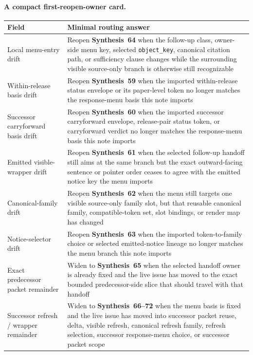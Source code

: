 \documentclass[11pt]{article}
\begin{document}
\paragraph{A compact first-reopen-owner card.}
\begin{table}[t]
\centering
\small
\begin{tabularx}{\linewidth}{@{}lX@{}}
\toprule
Field & Minimal routing answer \\
\midrule
Local menu-entry drift & Reopen \textbf{Synthesis~64} when the follow-up class, owner-side menu key, selected \nolinkurl{object_key}, canonical citation path, or sufficiency clause changes while the surrounding visible source-only branch is otherwise still recognizable \\
Within-release basis drift & Reopen \textbf{Synthesis~59} when the imported within-release status envelope or its paper-level token no longer matches the response-menu basis this note imports \\
Successor carryforward basis drift & Reopen \textbf{Synthesis~60} when the imported successor carryforward envelope, release-pair status token, or carryforward verdict no longer matches the response-menu basis this note imports \\
Emitted visible-wrapper drift & Reopen \textbf{Synthesis~61} when the selected follow-up handoff still aims at the same branch but the exact outward-facing sentence or pointer order ceases to agree with the emitted notice key the menu imports \\
Canonical-family drift & Reopen \textbf{Synthesis~62} when the menu still targets one visible source-only family slot, but that reusable canonical family, compatible-token set, slot bindings, or render map has changed \\
Notice-selector drift & Reopen \textbf{Synthesis~63} when the imported token-to-family choice or selected emitted-notice lineage no longer matches the menu branch this note imports \\
Exact predecessor packet remainder & Widen to \textbf{Synthesis~65} when the selected handoff owner is already fixed and the live issue has moved to the exact bounded predecessor-side slice that should travel with that handoff \\
Successor refresh / wrapper remainder & Widen to \textbf{Synthesis~66--72} when the menu basis is fixed and the live issue has moved into successor packet reuse, delta, visible refresh, canonical refresh family, refresh selection, successor response-menu choice, or successor packet scope \\

\end{tabularx}
\end{table}
\end{document}
